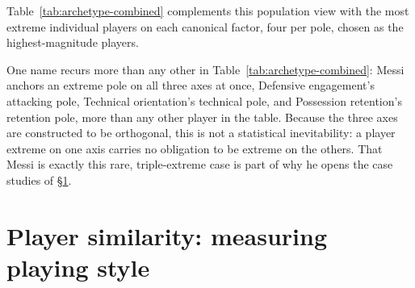 Table~\ref{tab:archetype-combined} complements this population view with the most extreme individual players
on each canonical factor, four per pole, chosen as the highest-magnitude players.

\begin{table}[tbp]
\centering
\caption{The four highest-magnitude, recognisable players on each pole of each canonical factor.}
\label{tab:archetype-combined}

\end{table}

One name recurs more than any other in Table~\ref{tab:archetype-combined}: Messi anchors an extreme pole on
all three axes at once, Defensive engagement's attacking pole, Technical orientation's technical pole, and
Possession retention's retention pole, more than any other player in the table. Because the three axes are constructed to be orthogonal, this is not a statistical
inevitability: a player extreme on one axis carries no obligation to be extreme on the others. That Messi is
exactly this rare, triple-extreme case is part of why he opens the case studies of \S\ref{sec:results-similarity}.

\FloatBarrier

\section{Player similarity: measuring playing style}
\label{sec:results-similarity}

